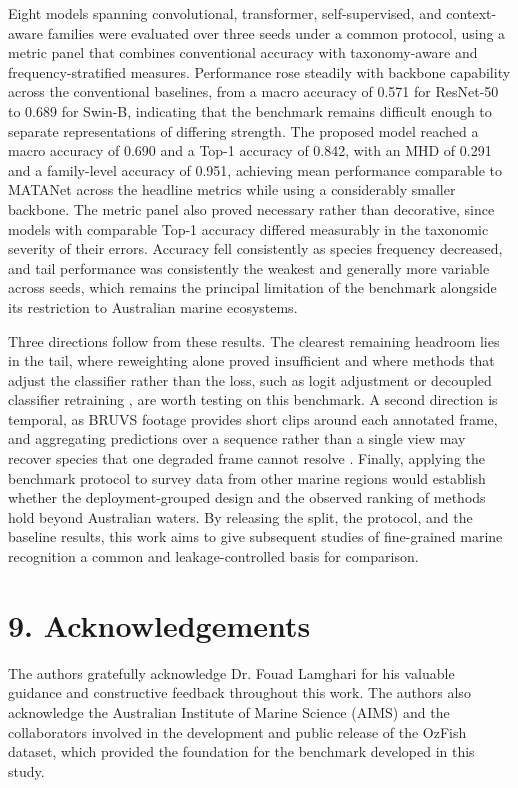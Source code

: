 \documentclass[preprint,12pt]{elsarticle}
\begin{document}
Eight models spanning convolutional, transformer, self-supervised, and
context-aware families were evaluated over three seeds under a common
protocol, using a metric panel that combines conventional accuracy with
taxonomy-aware and frequency-stratified measures. Performance rose
steadily with backbone capability across the conventional baselines,
from a macro accuracy of 0.571 for ResNet-50 to 0.689 for Swin-B,
indicating that the benchmark remains difficult enough to separate
representations of differing strength. The proposed model reached a
macro accuracy of 0.690 and a Top-1 accuracy of 0.842, with an MHD of
0.291 and a family-level accuracy of 0.951, achieving mean performance
comparable to MATANet across the headline metrics while using a
considerably smaller backbone. The metric panel also proved necessary
rather than decorative, since models with comparable Top-1 accuracy
differed measurably in the taxonomic severity of their errors. Accuracy
fell consistently as species frequency decreased, and tail performance
was consistently the weakest and generally more variable across seeds,
which remains the principal limitation of the benchmark alongside its
restriction to Australian marine ecosystems.

Three directions follow from these results. The clearest remaining
headroom lies in the tail, where reweighting alone proved insufficient
and where methods that adjust the classifier rather than the loss, such
as logit adjustment or decoupled classifier retraining
\cite{ref65}, are worth testing on this
benchmark. A second direction is temporal, as BRUVS footage provides
short clips around each annotated frame, and aggregating predictions
over a sequence rather than a single view may recover species that one
degraded frame cannot resolve \cite{ref50}.
Finally, applying the benchmark protocol to survey data from other
marine regions \cite{ref13} would establish
whether the deployment-grouped design and the observed ranking of
methods hold beyond Australian waters. By releasing the split, the
protocol, and the baseline results, this work aims to give subsequent
studies of fine-grained marine recognition a common and
leakage-controlled basis for comparison.

\section*{9. Acknowledgements}\label{acknowledgements}

The authors gratefully acknowledge Dr. Fouad Lamghari for his valuable
guidance and constructive feedback throughout this work. The authors
also acknowledge the Australian Institute of Marine Science (AIMS) and
the collaborators involved in the development and public release of the
OzFish dataset, which provided the foundation for the benchmark
developed in this study.
\end{document}
